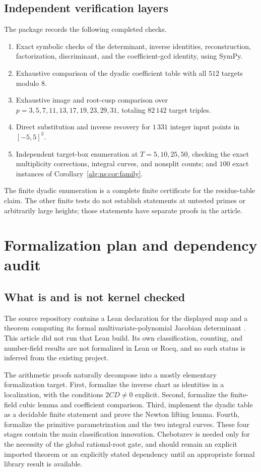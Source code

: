 \documentclass[11pt]{article}
\numberwithin{equation}{section}
\theoremstyle{plain}
\theoremstyle{plain}
\theoremstyle{plain}
\theoremstyle{definition}
\theoremstyle{definition}
\theoremstyle{definition}
\theoremstyle{remark}
\begin{document}
\subsection{Independent verification layers}
The package records the following completed checks.
\begin{enumerate}[label=(\roman*)]
\item Exact symbolic checks of the determinant, inverse identities,
reconstruction, factorization, discriminant, and the coefficient-gcd
identity, using SymPy.
\item Exhaustive comparison of the dyadic coefficient table with all
$512$ targets modulo $8$.
\item Exhaustive image and root-cusp comparison over
$p=3,5,7,11,13,17,19,23,29,31$, totaling $82\,142$ target triples.
\item Direct substitution and inverse recovery for $1\,331$ integer
input points in $[-5,5]^3$.
\item Independent target-box enumeration at $T=5,10,25,50$, checking
the exact multiplicity corrections, integral curves, and nonsplit
counts; and $100$ exact instances of Corollary~\ref{alg:ns:cor:family}.
\end{enumerate}
The finite dyadic enumeration is a complete finite certificate for the
residue-table claim. The other finite tests do not establish statements
at untested primes or arbitrarily large heights; those statements have
separate proofs in the article.

\section{Formalization plan and dependency audit}\label{alg:ns:sec:formal}

\subsection{What is and is not kernel checked}
The source repository contains a Lean declaration for the displayed map
and a theorem computing its formal multivariate-polynomial Jacobian
determinant \cite{dh:proveitformal}. This article did not run that Lean build.
Its own classification, counting, and number-field results are not
formalized in Lean or Rocq, and no such status is inferred from the
existing project.

The arithmetic proofs naturally decompose into a mostly elementary
formalization target. First, formalize the inverse chart as identities
in a localization, with the conditions $2C D\ne0$ explicit. Second,
formalize the finite-field cubic lemma and coefficient comparison.
Third, implement the dyadic table as a decidable finite statement and
prove the Newton lifting lemma. Fourth, formalize the primitive
parametrization and the two integral curves. These four stages contain
the main classification innovation. Chebotarev is needed only for the
necessity of the global rational-root gate, and should remain an
explicit imported theorem or an explicitly stated dependency until an
appropriate formal library result is available.
\end{document}
